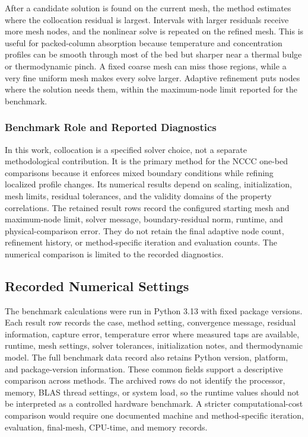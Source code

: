                 After a candidate solution is found on the current mesh, the method estimates where the collocation residual is largest. Intervals with larger residuals receive more mesh nodes, and the nonlinear solve is repeated on the refined mesh. This is useful for packed-column absorption because temperature and concentration profiles can be smooth through most of the bed but sharper near a thermal bulge or thermodynamic pinch. A fixed coarse mesh can miss those regions, while a very fine uniform mesh makes every solve larger. Adaptive refinement puts nodes where the solution needs them, within the maximum-node limit reported for the benchmark.

            \subsubsection*{Benchmark Role and Reported Diagnostics}
                In this work, collocation is a specified solver choice, not a separate methodological contribution. It is the primary method for the NCCC one-bed comparisons because it enforces mixed boundary conditions while refining localized profile changes. Its numerical results depend on scaling, initialization, mesh limits, residual tolerances, and the validity domains of the property correlations. The retained result rows record the configured starting mesh and maximum-node limit, solver message, boundary-residual norm, runtime, and physical-comparison error. They do not retain the final adaptive node count, refinement history, or method-specific iteration and evaluation counts. The numerical comparison is limited to the recorded diagnostics.

        \subsection{Recorded Numerical Settings}
            The benchmark calculations were run in Python 3.13 with fixed package versions. Each result row records the case, method setting, convergence message, residual information, capture error, temperature error where measured taps are available, runtime, mesh settings, solver tolerances, initialization notes, and thermodynamic model. The full benchmark data record also retains Python version, platform, and package-version information. These common fields support a descriptive comparison across methods. The archived rows do not identify the processor, memory, BLAS thread settings, or system load, so the runtime values should not be interpreted as a controlled hardware benchmark. A stricter computational-cost comparison would require one documented machine and method-specific iteration, evaluation, final-mesh, CPU-time, and memory records.

